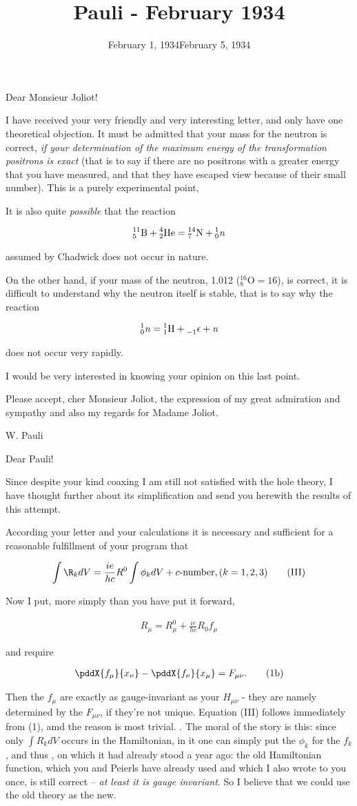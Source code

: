 \documentclass{article}
\title{Pauli - February 1934}
\newcommand{\nequ}[2]{
\begin{align*}
#1
\tag{#2}
\end{align*}
}
\newcommand{\uequ}[1]{
\begin{align*}
#1
\end{align*}
}
\begin{document}
\date{February 1, 1934}

\newcommand{\Elt}[3]{{}^{#2}_{#3}\text{#1}}

Dear Monsieur Joliot!

I have received your very friendly and very interesting letter, and only have one theoretical objection. It must be admitted that your mass for the neutron is correct, \textit{if your determination of the maximum energy of the transformation positrons is exact} (that is to say if there are no positrons with a greater energy that you have measured, and that they have escaped view because of their small number). This is a purely experimental point,

It is also quite \textit{possible} that the reaction

\uequ{
\Elt{B}{11}{5} + \Elt{He}{4}{2} = \Elt{N}{14}{7} + \Elt{\textit{n}}{1}{0}
}
assumed by Chadwick does not occur in nature.

On the other hand, if your mass of the neutron, 1.012 ($\Elt{O}{16}{8} = 16$), is correct, it is difficult to understand why the neutron itself is stable, that is to say why the reaction
\uequ{
\Elt{\textit{n}}{1}{0} = \Elt{H}{1}{1} + \Elt{$\epsilon$}{}{-1} + \textit{n}
}
does not occur very rapidly.

I would be very interested in knowing your opinion on this last point.

Please accept, cher Monsieur Joliot, the expression of my great admiration and sympathy and also my regards for Madame Joliot.

W. Pauli

\date{February 5, 1934}

Dear Pauli!

Since despite your kind coaxing I am still not satisfied with the hole theory, I have thought further about its simplification and send you herewith the results of this attempt.

According your letter and your calculations it is necessary and sufficient for a reasonable fulfillment of your program that
\nequ{
\int \R_k {dV} = \frac{ie}{hc} R^0 \int \phi_k {dV} + c\text{-number}, (k=1,2,3)
}{III}
Now I put, more simply than you have put it forward,
\nequ{
R_\mu = R^0_\mu + \frac{ie}{hc}R_0 f_\mu
}{1a}
and require
\nequ{
\pddX{f_\mu}{x_\nu} - \pddX{f_\nu}{x_\mu} = F_{\mu\nu}.
}{1b}
Then the $f_\mu$ are exactly as gauge-invariant as your $H_{\mu\nu}$ - they are namely determined by the $F_{\mu\nu}$, if they're not unique. Equation (III) follows immediately from (1), amd the reason is most trivial. . The moral of the story is this: since only $\int R_k {dV}$ occurs in the Hamiltonian, in it one can simply put the $\phi_k$ for the $f_k$, and thus , on which it had already stood a year ago: the old Hamiltonian function, which you and Peierls have already used and which I also wrote to you once, is still correct -- \textit{at least it is gauge invariant}. So I believe that we could use the old theory  as the new.
\end{document}
